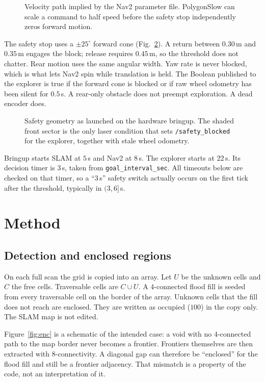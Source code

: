\documentclass[11pt]{article}
\begin{document}
\begin{figure}[ht]
\centering
\FigCommandChain
\caption{Velocity path implied by the Nav2 parameter file. PolygonSlow can scale a command to half speed before the safety stop independently zeros forward motion.}
\label{fig:chain}
\end{figure}

The safety stop uses a $\pm 25^\circ$ forward cone (Fig.~\ref{fig:cone}). A return between $0.30$\,m and $0.35$\,m engages the block; release requires $0.45$\,m, so the threshold does not chatter. Rear motion uses the same angular width. Yaw rate is never blocked, which is what lets Nav2 spin while translation is held. The Boolean published to the explorer is true if the forward cone is blocked or if raw wheel odometry has been silent for $0.5$\,s. A rear-only obstacle does not preempt exploration. A dead encoder does.

\begin{figure}[ht]
\centering
\FigSafetyCone
\caption{Safety geometry as launched on the hardware bringup. The shaded front sector is the only laser condition that sets \texttt{/safety\_blocked} for the explorer, together with stale wheel odometry.}
\label{fig:cone}
\end{figure}

Bringup starts SLAM at $5$\,s and Nav2 at $8$\,s. The explorer starts at $22$\,s. Its decision timer is $3$\,s, taken from \texttt{goal\_interval\_sec}. All timeouts below are checked on that timer, so a ``$3$\,s'' safety switch actually occurs on the first tick after the threshold, typically in $(3,6]$\,s.

\section{Method}
\subsection{Detection and enclosed regions}
On each full scan the grid is copied into an array. Let $U$ be the unknown cells and $C$ the free cells. Traversable cells are $C\cup U$. A 4-connected flood fill is seeded from every traversable cell on the border of the array. Unknown cells that the fill does not reach are enclosed. They are written as occupied ($100$) in the copy only. The SLAM map is not edited.

Figure~\ref{fig:enc} is a schematic of the intended case: a void with no 4-connected path to the map border never becomes a frontier. Frontiers themselves are then extracted with 8-connectivity. A diagonal gap can therefore be ``enclosed'' for the flood fill and still be a frontier adjacency. That mismatch is a property of the code, not an interpretation of it.
\end{document}
